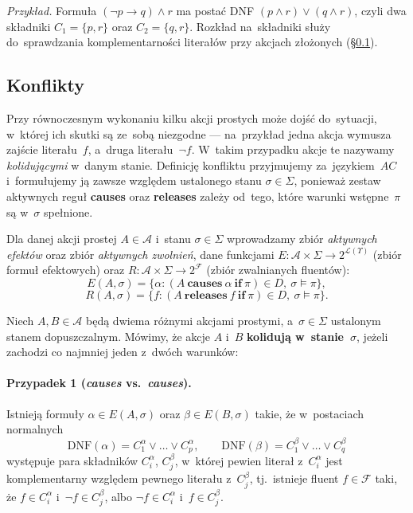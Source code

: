 \documentclass[11pt,a4paper]{article}
\newif\ifshowbib
\newcommand{\bibonly}[1]{\ifshowbib#1\fi}
\renewcommand{\cite}[2][]{\unskip}%
\newcommand{\causes}{\textbf{causes}}
\renewcommand{\iff}{\textbf{if}}
\newcommand{\releases}{\textbf{releases}}
\newcommand{\DNF}{\mathrm{DNF}}
\theoremstyle{definition}
\begin{document}
\smallskip\noindent\emph{Przykład.}
Formuła $(\neg p \to q) \land r$ ma postać DNF $(p \land r) \lor (q \land r)$, czyli dwa składniki $C_1 = \{p, r\}$ oraz $C_2 = \{q, r\}$. Rozkład na~składniki służy do~sprawdzania komplementarności literałów przy akcjach złożonych (\S\ref{sec:konflikty}).

\subsection{Konflikty}
\label{sec:konflikty}

Przy równoczesnym wykonaniu kilku akcji prostych może dojść do~sytuacji,
w~której ich skutki są ze~sobą niezgodne --- na~przykład jedna akcja
wymusza zajście literału~$f$, a~druga literału~$\neg f$. W~takim
przypadku akcje te nazywamy \emph{kolidującymi} w~danym stanie.
Definicję konfliktu przyjmujemy za~językiem~$AC$\bibonly{~\cite{rw05}}
i~formułujemy ją zawsze względem ustalonego stanu $\sigma \in \Sigma$,
ponieważ zestaw aktywnych reguł \causes{} oraz \releases{} zależy od~tego,
które warunki wstępne~$\pi$ są w~$\sigma$ spełnione.

Dla danej akcji prostej $A \in \mathcal{A}$ i~stanu $\sigma \in \Sigma$
wprowadzamy zbiór \emph{aktywnych efektów} oraz zbiór \emph{aktywnych zwolnień}, dane funkcjami
$E : \mathcal{A} \times \Sigma \to 2^{\mathcal{L}(\Upsilon)}$ (zbiór formuł efektowych) oraz
$R : \mathcal{A} \times \Sigma \to 2^{\mathcal{F}}$ (zbiór zwalnianych fluentów):
\[
  E(A,\sigma)=\{\alpha : (A\ \causes\ \alpha\ \iff\ \pi)\in D,\ \sigma \models \pi\},
\]
\[
  R(A,\sigma)=\{f : (A\ \releases\ f\ \iff\ \pi)\in D,\ \sigma \models \pi\}.
\]

\noindent Niech $A, B \in \mathcal{A}$ będą dwiema różnymi akcjami prostymi, a~$\sigma \in \Sigma$
ustalonym stanem dopuszczalnym. Mówimy, że akcje $A$ i~$B$
\textbf{kolidują w~stanie~$\sigma$}, jeżeli zachodzi co najmniej jeden
z~dwóch warunków:

\paragraph{Przypadek 1 (\textit{causes} vs.\ \textit{causes}).}
Istnieją formuły $\alpha \in E(A,\sigma)$ oraz $\beta \in E(B,\sigma)$
takie, że w~postaciach normalnych
\[
  \DNF(\alpha) = C_1^\alpha \lor \ldots \lor C_{p}^\alpha,
  \qquad
  \DNF(\beta) = C_1^\beta \lor \ldots \lor C_{q}^\beta
\]
występuje para składników $C_i^\alpha$, $C_j^\beta$, w~której pewien
literał z~$C_i^\alpha$ jest komplementarny względem pewnego literału
z~$C_j^\beta$, tj.\ istnieje fluent $f \in \mathcal{F}$ taki, że
$f \in C_i^\alpha$ i~$\neg f \in C_j^\beta$, albo $\neg f \in C_i^\alpha$
i~$f \in C_j^\beta$.
\end{document}

